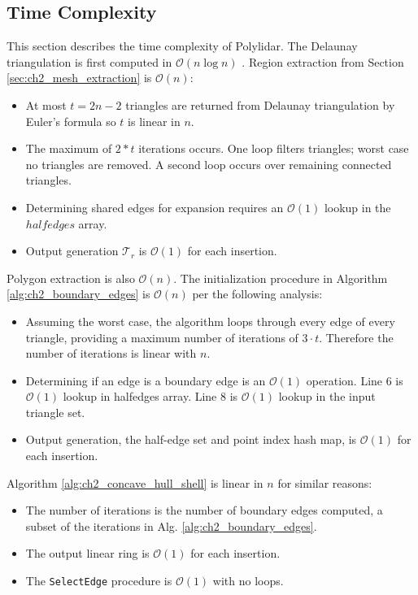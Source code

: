 \subsection{Time Complexity}\label{sec:time_complexity}
This section describes the time complexity of Polylidar.
The Delaunay triangulation is first computed in $\mathcal{O}(n\log{}n)$ \cite{de_berg_delaunay_2008}. Region extraction from Section \ref{sec:ch2_mesh_extraction} is $\mathcal{O}(n)$:

\begin{itemize}
    \item At most $t = 2n - 2$ triangles are returned from Delaunay triangulation by Euler's formula so $t$ is linear in $n$.
    \item The maximum of $2*t$ iterations occurs. One loop filters triangles; worst case no triangles are removed. A second loop occurs over remaining connected triangles.
    \item Determining shared edges for expansion requires an $\mathcal{O}(1)$ lookup in the $halfedges$ array.
    \item Output generation $\mathcal{T}_{r}$ is $\mathcal{O}(1)$ for each insertion.
\end{itemize}

Polygon extraction is also $\mathcal{O}(n)$. The initialization procedure in Algorithm \ref{alg:ch2_boundary_edges} is $\mathcal{O}(n)$ per the following analysis:
\begin{itemize}
    \item Assuming the worst case, the algorithm loops through every edge of every triangle, providing a maximum number of iterations of $3 \cdot t$. Therefore the number of iterations is linear with $n$.
    \item Determining if an edge is a boundary edge is an $\mathcal{O}(1)$ operation. Line 6 is $\mathcal{O}(1)$ lookup in halfedges array. Line 8 is $\mathcal{O}(1)$ lookup in the input triangle set.
    \item Output generation, the half-edge set and point index hash map, is $\mathcal{O}(1)$ for each insertion.
\end{itemize}

Algorithm \ref{alg:ch2_concave_hull_shell} is linear in $n$ for similar reasons:
\begin{itemize}
    \item The number of iterations is the number of boundary edges computed, a subset of the iterations in Alg. \ref{alg:ch2_boundary_edges}.
    \item The output linear ring is $\mathcal{O}(1)$ for each insertion.
    \item The \texttt{SelectEdge} procedure is $\mathcal{O}(1)$ with no loops.
\end{itemize}

